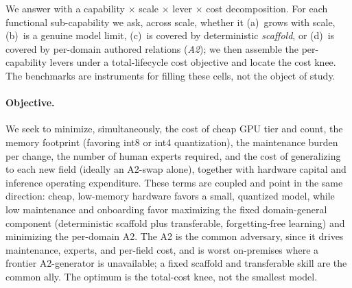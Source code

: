 \documentclass[10pt]{article}
\begin{document}
We answer with a capability $\times$ scale $\times$ lever $\times$ cost decomposition. For each functional sub-capability we ask, across scale, whether it (a)~grows with scale, (b)~is a genuine model limit, (c)~is covered by deterministic \emph{scaffold}, or (d)~is covered by per-domain authored relations (\emph{A2}); we then assemble the per-capability levers under a total-lifecycle cost objective and locate the cost knee. The benchmarks are instruments for filling these cells, not the object of study.

\paragraph{Objective.}
We seek to minimize, simultaneously, the cost of cheap GPU tier and count, the memory footprint (favoring int8 or int4 quantization), the maintenance burden per change, the number of human experts required, and the cost of generalizing to each new field (ideally an A2-swap alone), together with hardware capital and inference operating expenditure. These terms are coupled and point in the same direction: cheap, low-memory hardware favors a small, quantized model, while low maintenance and onboarding favor maximizing the fixed domain-general component (deterministic scaffold plus transferable, forgetting-free learning) and minimizing the per-domain A2. The A2 is the common adversary, since it drives maintenance, experts, and per-field cost, and is worst on-premises where a frontier A2-generator is unavailable; a fixed scaffold and transferable skill are the common ally. The optimum is the total-cost knee, not the smallest model.
\end{document}

